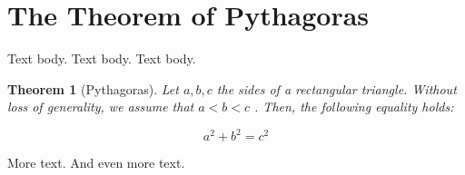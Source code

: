 \documentclass{article}
\theoremstyle{quote}
\newtheorem{thm}{Theorem}
\begin{document}
\section*{The Theorem of Pythagoras}

Text body. Text body. Text body.

\begin{thm}[Pythagoras]
	Let $a,b,c$ the sides of a rectangular triangle.
	Without loss of generality, we assume that  $a<b<c$ .
	Then, the following equality holds:
	
	\[a^2 + b^2 = c^2\]
\end{thm}

\noindent More text. And even more text.
\end{document}
